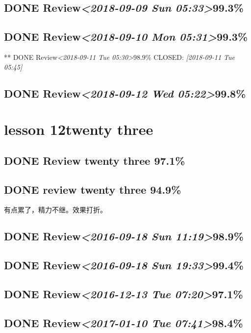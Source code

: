 \documentclass[11pt]{ctexart}
\begin{document}
\subsection{{\bfseries\sffamily DONE} Review\textit{<2018-09-09 Sun 05:33>}99.3\%}
\label{sec:org0ffe749}
\subsection{{\bfseries\sffamily DONE} Review\textit{<2018-09-10 Mon 05:31>}99.3\%}
\label{sec:orgd0c597e}
** DONE Review\textit{<2018-09-11 Tue 05:30>}98.9\%
CLOSED: \textit{[2018-09-11 Tue 05:45]}
\subsection{{\bfseries\sffamily DONE} Review\textit{<2018-09-12 Wed 05:22>}99.8\%}
\label{sec:org8a611e8}
\section{lesson 12twenty three}
\label{sec:orgca0c44f}
\subsection{{\bfseries\sffamily DONE} Review twenty three 97.1\%}
\label{sec:org622beee}
\subsection{{\bfseries\sffamily DONE} review twenty three 94.9\%}
\label{sec:orgb3518bd}
有点累了，精力不继。效果打折。

\subsection{{\bfseries\sffamily DONE} Review\textit{<2016-09-18 Sun 11:19>}98.9\%}
\label{sec:org9c39ec6}
\subsection{{\bfseries\sffamily DONE} Review\textit{<2016-09-18 Sun 19:33>}99.4\%}
\label{sec:org6598096}
\subsection{{\bfseries\sffamily DONE} Review\textit{<2016-12-13 Tue 07:20>}97.1\%}
\label{sec:org34def89}
\subsection{{\bfseries\sffamily DONE} Review\textit{<2017-01-10 Tue 07:41>}98.4\%}
\label{sec:orgaf29912}
\end{document}
